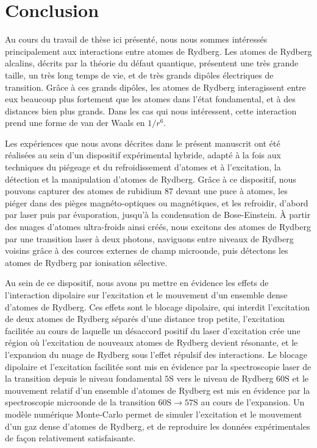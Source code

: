 \chapter*{Conclusion}\label{chapter:concl}
 \mtcaddchapter
{}
 
\noindent Au cours du travail de thèse ici présenté, nous nous sommes intéressés principalement aux interactions entre atomes de Rydberg.
Les atomes de Rydberg alcalins, décrits par la théorie du défaut quantique, présentent une très grande taille, un très long temps de vie, et de très grands dipôles électriques de transition.
Grâce à ces grands dipôles, les atomes de Rydberg interagissent entre eux beaucoup plus fortement que les atomes dans l'état fondamental, et à des distances bien plus grands.
Dans les cas qui nous intéressent, cette interaction prend une forme de van der Waals en $1/r^6$.

Les expériences que nous avons décrites dans le présent manuscrit ont été réalisées au sein d'un dispositif expérimental hybride, adapté à la fois aux techniques du piégeage et du refroidissement d'atomes et à l'excitation, la détection et la  manipulation d'atomes de Rydberg.
Grâce à ce dispositif, nous pouvons capturer des atomes de rubidium $87$ devant une puce à atomes, les piéger dans des pièges magnéto-optiques ou magnétiques, et les refroidir, d'abord par laser puis par évaporation, jusqu'à la condensation de Bose-Einstein.
\`A partir des nuages d'atomes ultra-froids ainsi créés, nous excitons des atomes de Rydberg par une transition laser à deux photons, naviguons entre niveaux de Rydberg voisins grâce à des cources externes de champ microonde, puis détectons les atomes de Rydberg par ionisation sélective.

Au sein de ce dispositif, nous avons pu mettre en évidence les effets de l'interaction dipolaire sur l'excitation et le mouvement d'un ensemble dense d'atomes de Rydberg.
Ces effets sont le blocage dipolaire, qui interdit l'excitation de deux atomes de Rydberg séparés d'une distance trop petite, l'excitation facilitée au cours de laquelle un désaccord positif du laser d'excitation crée une région où l'excitation de nouveaux atomes de Rydberg devient résonante, et le l'expansion du nuage de Rydberg sous l'effet répulsif des interactions.
Le blocage dipolaire et l'excitation facilitée sont mis en évidence par la spectroscopie laser de la transition depuis le niveau fondamental $\mathrm{5S}$ vers le niveau de Rydberg $\mathrm{60S}$ et le mouvement relatif d'un ensemble d'atomes de Rydberg est mis en évidence par la spectroscopie microonde de la transition $\mathrm{60S \rightarrow 57S}$ au cours de l'expansion.
Un modèle numérique Monte-Carlo permet de simuler l'excitation et le mouvement d'un gaz dense d'atomes de Rydberg, et de reproduire les données expérimentales de façon relativement satisfaisante.

